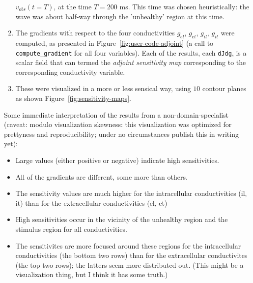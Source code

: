 \documentclass[a4paper, reqno]{amsart}
\numberwithin{equation}{section}
\begin{document}
\begin{enumerate}
    $v_{obs}(t = T)$, at the time $T = 200$ ms. This time was chosen
    heuristically: the wave was about half-way through the 'unhealthy'
    region at this time.
  \item
    The gradients with respect to the four conductivities $g_{el}$,
    $g_{et}$, $g_{il}$, $g_{it}$ were computed, as presented in
    Figure~\ref{fig:user-code-adjoint} (a call to
    \texttt{compute\_gradient} for all four variables). Each of the
    results, each \texttt{dJdg}, is a scalar field that can termed the
    \emph{adjoint sensitivity map} corresponding to the corresponding
    conductivity variable.
  \item
    These were visualized in a more or less sensical way, using $10$
    contour planes as shown Figure~\ref{fig:sensitivity-maps}.
\end{enumerate}

Some immediate interpretation of the results from a
non-domain-specialist (caveat: modulo visualization skewness: this
visualization was optimized for prettyness and reproducibility; under
no circumstances publish this in writing yet):
\begin{itemize}
\item
  Large values (either positive or negative) indicate high
  sensitivities.
\item
  All of the gradients are different, some more than others.
\item
  The sensitivity values are much higher for the intracellular
  conductivities (il, it) than for the extracellular
  conductivities (el, et)
\item
  High sensitivities occur in the vicinity of the unhealthy region
  and the stimulus region for all conductivities.
\item
  The sensitivites are more focused around these regions for the
  intracellular conductivities (the bottom two rows) than for the
  extracellular conductivites (the top two rows); the latters seem
  more distributed out. (This might be a visualization thing, but
  I think it has some truth.)
\end{itemize}
\end{document}
